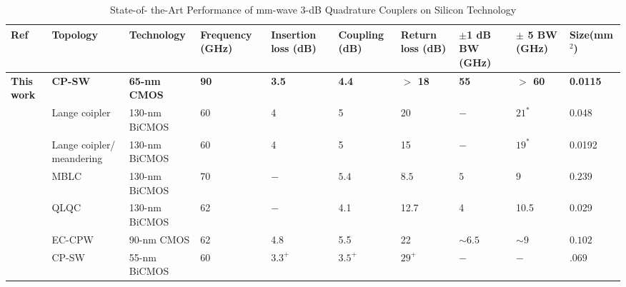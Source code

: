 \documentclass[journal]{IEEEtran}
\begin{document}
\begin{table*}
	\caption{State-of- the-Art Performance of mm-wave 3-dB Quadrature Couplers on Silicon Technology}
	\label{table:technology} %
	\begin{tabular}{ |p{1.6cm}|p{1.7cm}|p{2.1cm}|p{1cm}|p{1cm}|p{1cm}|p{1cm}|p{1cm}|p{1cm}|p{1.2cm}| }
		\hline
		Ref & Topology  & Technology & Frequency (GHz) & Insertion loss (dB) & Coupling (dB) & Return loss (dB) & $\pm$1 dB BW (GHz) & $\pm$ 5 BW (GHz) & Size(mm$^2$) \\ %
		\hline
		\textbf{This work} & \textbf{CP-SW}  & \textbf{65-nm CMOS} & \textbf{90} & \textbf{3.5}  &  \textbf{4.4} & \textbf{$>$ 18} & \textbf{55} & \textbf{$>$ 60}  & \textbf{0.0115}\\ %
		\hline
		[Floyd.IMS] & Lange coipler & 130-nm BiCMOS  & 60 & 4 & 5 & 20 & $-$ & $21^*$ & 0.048\\ %
		\hline
		[Floyd.IMS] & Lange coipler/ meandering & 130-nm BiCMOS  & 60 & 4 & 5 & 15 & $-$ & $19^*$ & 0.0192\\ %
		\hline
		[D.Titz] & MBLC & 130-nm BiCMOS  & 70 & $-$ & $5.4$ & $8.5$ & $5$ & $9$ & $0.239$\\ %
		\hline
		[D.Titz] & QLQC & 130-nm BiCMOS  & 62 & $-$ & 4.1 & 12.7 & 4 & 10.5 & 0.029\\ %
		\hline
		[EC.CPW] & EC-CPW & 90-nm CMOS  & 62 & 4.8 & 5.5 & 22 & $\sim 6.5$ & $\sim 9$ & $0.102$\\ %
		\hline
		[Ferrari.Thesis] & CP-SW & 55-nm BiCMOS  & 60 & $3.3^+$ & $3.5^+$ & $29^+$ & $-$ & $-$ & $.069$\\ %
		\hline
	\end{tabular}
\end{table*}
%
%
\end{document}
